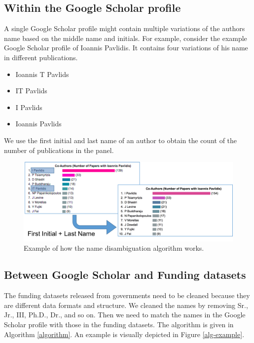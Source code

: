 \subsection{Within the Google Scholar profile}

A single Google Scholar profile might contain multiple variations of the authors name based on the middle name and initials. For example, consider the example Google Scholar profile of Ioannis Pavlidis. It contains four variations of his name in different publications.

\begin{itemize}
\item Ioannis T Pavlids
\item IT Pavlids
\item I Pavlids
\item Ioannis Pavlids
\end{itemize}

We use the first initial and last name of an author to obtain the count of the number of publications in the panel.

\begin{figure}[H]
\begin{center}
  \includegraphics[width=.9\textwidth]{figures/fig-name-dis-example1}
\caption{Example of how the name disambiguation algorithm works.}
\label{default}
\end{center}
\end{figure}




\subsection{Between Google Scholar and Funding datasets}

The funding datasets released from governments need to be cleaned because they are different data formats and structure. We cleaned the names by removing Sr., Jr., III, Ph.D., Dr., and so on. Then we need to match the names in the Google Scholar profile with those in the funding datasets. The algorithm is given in Algorithm \ref{algorithm}. An example is visually depicted in Figure \ref{alg-example}.

